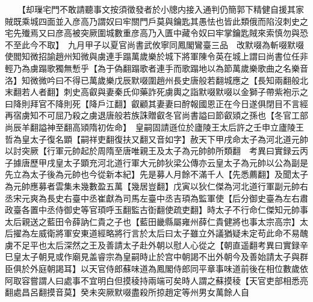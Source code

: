 　　【却璅宅門不敢請聽事文按須徵發者於小牕内接入通判仍簡郭下精健自援其家賊既乘城四面並入彦高乃謂奴曰牢關門戶莫與鑰匙其愚怯也皆此類俄而陷沒刺史之宅先殱焉又曰彦高被突厥圍城數重彦高乃入匱中藏令奴曰牢掌鑰匙賊來索慎勿與恐不至此今不取】　九月甲子以夏官尚書武攸寧同鳳閣鸞臺三品　改默啜為斬啜默啜使閻知微招諭趙州知微與虜連手蹋萬歲樂於城下將軍陳令英在城上謂曰尚書位任非輕乃為虜蹋歌獨無慙乎【為于偽翻蹋歌者連手而歌蹋地以為節萬歲樂歌曲之名樂音洛】知微微吟曰不得已萬歲樂戊辰默啜圍趙州長史唐般若翻城應之【長知兩翻般北末翻若人者翻】刺史高叡與妻秦氏仰藥詐死虜輿之詣默啜默啜以金獅子帶紫袍示之曰降則拜官不降則死【降戶江翻】叡顧其妻妻曰酧報國恩正在今日遂俱閉目不言經再宿虜知不可屈乃殺之虜退唐般若族誅贈叡冬官尚書謚曰節叡熲之孫也【冬官工部尚辰羊翻謚神至翻高熲隋初佐命】　皇嗣固請遜位於廬陵王太后許之壬申立廬陵王哲為皇太子復名顕【嗣祥吏翻復扶又翻又音如字】赦天下甲戌命太子為河北道元帥以討突厥【行軍元帥起於周隋至唐唯親王及太子為元帥帥所類翻　考異曰實録云丙子據唐歷甲戌皇太子顕充河北道行軍大元帥狄梁公傳亦云皇太子為元帥以公為副是先立為太子後為元帥也今從新本紀】先是募人月餘不滿千人【先悉薦翻】及聞太子為元帥應募者雲集未幾數盈五萬【幾居豈翻】戊寅以狄仁傑為河北道行軍副元帥右丞宋元爽為長史右臺中丞崔獻為司馬左臺中丞吉頊為監軍使【后分御史臺為左右肅政臺各置中丞侍御史等官頊呼玉翻監古衘翻使疏吏翻】時太子不行命仁傑知元帥事太后親送之藍田令薛訥仁貴之子也【藍田畿縣屬雍州薛仁貴健將也事太宗高宗】太后擢為左威衛將軍安東道經略將行言於太后曰太子雖立外議猶疑未定苟此命不易醜虜不足平也太后深然之王及善請太子赴外朝以慰人心從之【朝直遥翻考異曰實録辛巳皇太子朝見或作廟見盖睿宗為皇嗣時止於宫中朝謁不出外朝今及善始請太子與群臣俱於外庭朝謁耳】以天官侍郎蘇味道為鳳閣侍郎同平章事味道前後在相位數歲依阿取容嘗謂人曰處事不宜明白但摸稜持兩端可矣時人謂之蘇摸稜【天官吏部相悉亮翻處昌呂翻摸音莫】癸未突厥默啜盡殺所掠趙定等州男女萬餘人自

